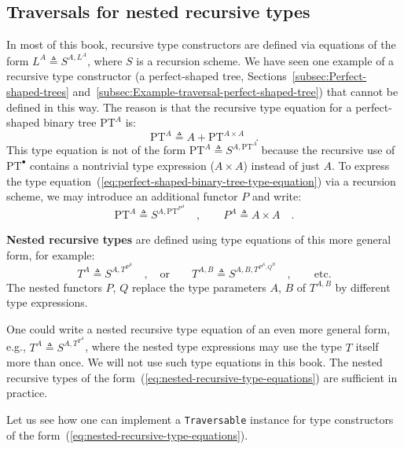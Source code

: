 \subsection{Traversals for nested recursive types}

In most of this book, recursive type constructors are defined via
equations of the form $L^{A}\triangleq S^{A,L^{A}}$, where $S$ is
a recursion scheme. We have seen one example of a recursive type constructor
(a perfect-shaped tree, Sections~\ref{subsec:Perfect-shaped-trees}
and~\ref{subsec:Example-traversal-perfect-shaped-tree}) that cannot
be defined in this way. The reason is that the recursive type equation
for a perfect-shaped binary tree $\text{PT}^{A}$
is:
\begin{equation}
\text{PT}^{A}\triangleq A+\text{PT}^{A\times A}\quad.\label{eq:perfect-shaped-binary-tree-type-equation}
\end{equation}
This type equation is not of the form $\text{PT}^{A}\triangleq S^{A,\text{PT}^{A}}$
because the recursive use of $\text{PT}^{\bullet}$ contains a nontrivial
type expression ($A\times A$) instead of just $A$. To express the
type equation~(\ref{eq:perfect-shaped-binary-tree-type-equation})
via a recursion scheme, we may introduce an additional functor $P$
and write:
\[
\text{PT}^{A}\triangleq S^{A,\text{PT}^{P^{A}}}\quad,\quad\quad P^{A}\triangleq A\times A\quad.
\]

\textbf{Nested recursive types} are
defined using type equations of this more general form, for example:
\begin{equation}
T^{A}\triangleq S^{A,T^{P^{A}}}\quad,\quad\text{or}\quad\quad T^{A,B}\triangleq S^{A,B,T^{P^{A},Q^{B}}}\quad,\quad\quad\text{etc.}\label{eq:nested-recursive-type-equations}
\end{equation}
The nested functors $P$, $Q$ replace the type parameters $A$, $B$
of $T^{A,B}$ by different type expressions. 

One could write a nested recursive type equation of an even more general
form, e.g., $T^{A}\triangleq S^{A,T^{T^{A}}}$, where the nested type
expressions may use the type $T$ itself more than once. We will not
use such type equations in this book. The nested recursive types of
the form~(\ref{eq:nested-recursive-type-equations}) are sufficient
in practice.

Let us see how one can implement a \lstinline!Traversable! instance
for type constructors of the form~(\ref{eq:nested-recursive-type-equations}).

